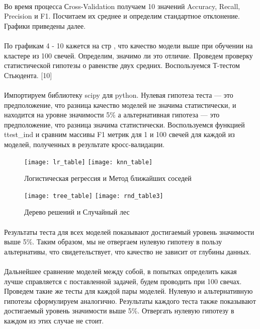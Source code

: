 \documentclass{article}
\begin{document}
	\paragraph{}
	Во время процесса Сross-Validation получаем 10 значений Accuracy, Recall, Precision и F1. Посчитаем их среднее и определим стандартное отклонение. Графики приведены далее.
	\paragraph{}
	По графикам 4 - 10  кажется на стр \pageref{lr_f1_table}, что качество модели выше при обучении на кластере из 100 свечей. Определим, значимо ли это отличие. Проведем проверку статистической гипотезы о равенстве двух средних. Воспользуемся Т-тестом Стьюдента. [10] 
	\paragraph{}
	Импортируем библиотеку scipy для python. Нулевая гипотеза теста — это предположение, что разница качество моделей не значима статистически, и находится на уровне значимости 5\% а альтернативная гипотеза — это предположение, что разница значима статистически. Воспользуемся функцией ttest\_ind и сравним массивы F1 метрик для 1 и 100 свечей для каждой из моделей, полученных в результате кросс-валидации. 
	\begin{figure}[!h]
		\centering
		\label{lr_f1_table}
		\texttt{[image: lr\_table]}
		\hfill
		\texttt{[image: knn\_table]}
		\caption{Логистическая регрессия и Метод ближайших соседей}
		\texttt{[image: tree\_table]}
		\hfill
		\texttt{[image: rnd\_table3]}
		\caption{Дерево решений и Случайный лес}
	\end{figure}
	\paragraph{}
	Результаты теста для всех моделей показывают достигаемый уровень значимости выше 5\%. Таким образом, мы не отвергаем нулевую гипотезу в пользу альтернативы, что свидетельствует, что качество не зависит от глубины данных. 
	\paragraph{}
	Дальнейшее сравнение моделей между собой, в попытках определить какая лучше справляется с поставленной задачей, будем проводить при 100 свечах. Проведем такие же тесты для каждой пары моделей. Нулевую и альтернативную гипотезы сформулируем аналогично. Результаты каждого теста также показывают достигаемый уровень значимости выше 5\%. Отвергать нулевую гипотезу в каждом из этих случае не стоит.
\end{document}
